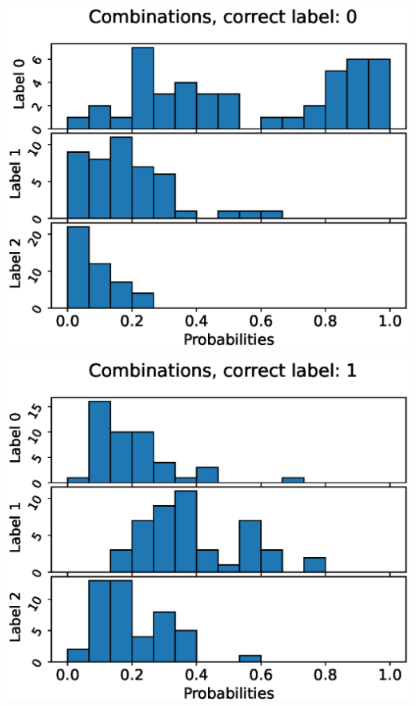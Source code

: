 \begin{center}
\begin{minipage}{0.33\textwidth}
  \includegraphics[width=\textwidth]{files/figs/app/hists/pelvis/c0.eps}
\end{minipage}%
\begin{minipage}{0.33\textwidth}
  \includegraphics[width=\textwidth]{files/figs/app/hists/pelvis/c1.eps}
\end{minipage}%
\begin{minipage}{0.33\textwidth}

\end{minipage}
\end{center}
